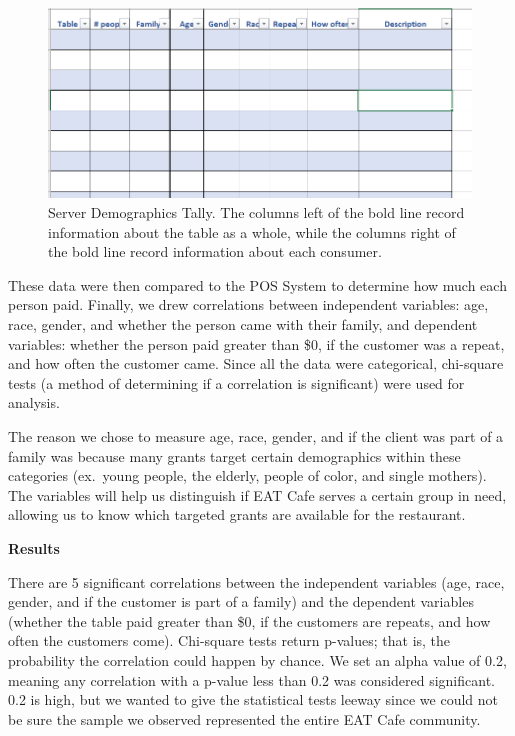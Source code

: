 \begin{figure}[h]
    \centering \includegraphics*[scale=.5]{assets/tallying-spreadsheet.png}
    
    \caption{Server Demographics Tally. The columns left of the bold line record information about the table as a whole, while the columns right of the bold line record information about each consumer.}\label{fig:server-demographics}
\end{figure}

These data were then compared to the POS System to determine how much each person paid. Finally, we drew correlations between independent variables: age, race, gender, and whether the person came with their family, and dependent variables: whether the person paid greater than \$0, if the customer was a repeat, and how often the customer came. Since all the data were categorical, chi-square tests (a method of determining if a correlation is significant) were used for analysis.

The reason we chose to measure age, race, gender, and if the client was part of a family was because many grants target certain demographics within these categories (ex.\ young people, the elderly, people of color, and single mothers). The variables will help us distinguish if EAT Cafe serves a certain group in need, allowing us to know which targeted grants are available for the restaurant.

\textbf{Results}

There are 5 significant correlations between the independent variables (age, race, gender, and if the customer is part of a family) and the dependent variables (whether the table paid greater than \$0, if the customers are repeats, and how often the customers come). Chi-square tests return p-values; that is, the probability the correlation could happen by chance. We set an alpha value of 0.2, meaning any correlation with a p-value less than 0.2 was considered significant. 0.2 is high, but we wanted to give the statistical tests leeway since we could not be sure the sample we observed represented the entire EAT Cafe community.

